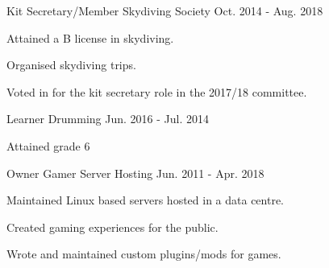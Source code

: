 

\begin{cventries}

  \cventry
    {Kit Secretary/Member} %
    {Skydiving Society} %
    {} %
    {Oct. 2014 - Aug. 2018} %
    {
      \begin{cvmitems} %
        \item {Attained a B license in skydiving.}
        \item {Organised skydiving trips.}
        \item {Voted in for the kit secretary role in the 2017/18 committee.}
      \end{cvmitems}
    }

  \cventry
    {Learner} %
    {Drumming} %
    {} %
    {Jun. 2016 - Jul. 2014} %
    {
      \begin{cvitems} %
        \item {Attained grade 6}
      \end{cvitems}
    }

  \cventry
    {Owner} %
    {Gamer Server Hosting} %
    {} %
    {Jun. 2011 - Apr. 2018} %
    {
      \begin{cvmitems} %
        \item {Maintained Linux based servers hosted in a data centre.}
        \item {Created gaming experiences for the public.}
        \item {Wrote and maintained custom plugins/mods for games.}
      \end{cvmitems}
    }

\end{cventries}
